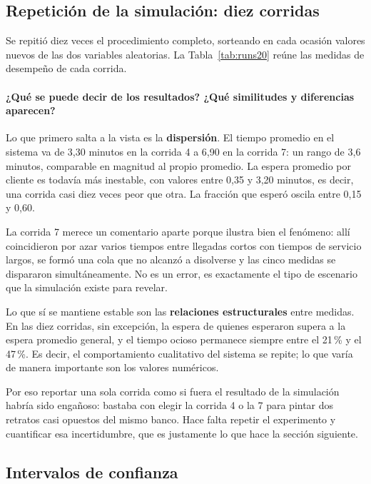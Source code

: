 \documentclass[11pt,letterpaper]{article}
\begin{document}
\subsection{Repetición de la simulación: diez corridas}

Se repitió diez veces el procedimiento completo, sorteando en cada ocasión valores nuevos de las dos variables aleatorias. La Tabla~\ref{tab:runs20} reúne las medidas de desempeño de cada corrida.



\paragraph{¿Qué se puede decir de los resultados? ¿Qué similitudes y diferencias aparecen?}

Lo que primero salta a la vista es la \textbf{dispersión}. El tiempo promedio en el sistema va de 3,30 minutos en la corrida 4 a 6,90 en la corrida 7: un rango de 3,6 minutos, comparable en magnitud al propio promedio. La espera promedio por cliente es todavía más inestable, con valores entre 0,35 y 3,20 minutos, es decir, una corrida casi diez veces peor que otra. La fracción que esperó oscila entre 0,15 y 0,60.

La corrida 7 merece un comentario aparte porque ilustra bien el fenómeno: allí coincidieron por azar varios tiempos entre llegadas cortos con tiempos de servicio largos, se formó una cola que no alcanzó a disolverse y las cinco medidas se dispararon simultáneamente. No es un error, es exactamente el tipo de escenario que la simulación existe para revelar.

Lo que sí se mantiene estable son las \textbf{relaciones estructurales} entre medidas. En las diez corridas, sin excepción, la espera de quienes esperaron supera a la espera promedio general, y el tiempo ocioso permanece siempre entre el 21\,\% y el 47\,\%. Es decir, el comportamiento cualitativo del sistema se repite; lo que varía de manera importante son los valores numéricos.

Por eso reportar una sola corrida como si fuera \guillemotleft el resultado\guillemotright{} de la simulación habría sido engañoso: bastaba con elegir la corrida 4 o la 7 para pintar dos retratos casi opuestos del mismo banco. Hace falta repetir el experimento y cuantificar esa incertidumbre, que es justamente lo que hace la sección siguiente.

\subsection{Intervalos de confianza}
\label{sec:ic20}
\end{document}
